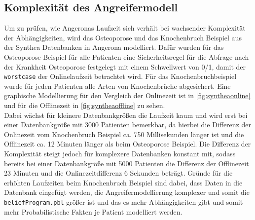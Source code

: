 \documentclass[german,version-2020-11]{uzl-thesis}
\begin{document}
\subsection{Komplexität des Angreifermodell}
Um zu prüfen, wie Angeronas Laufzeit sich verhält bei wachsender Komplexität der Abhängigkeiten, wird das Osteoporose und das Knochenbruch Beispiel aus der Synthea Datenbanken in Angerona modelliert. Dafür wurden für das Osteoporose Beispiel für alle Patienten eine Sicherheitsregel für die Abfrage nach der Krankheit Osteoporose festgelegt mit einem Schwellwert von 0/1, damit der \texttt{worstcase} der Onlinelaufzeit betrachtet wird. Für das Knochenbruchbeispiel wurde für jeden Patienten alle Arten von Knochenbrüche abgesichert. Eine graphische Modellierung für den Vergleich der Onlinezeit ist in \autoref{fig:syntheaonline} und für die Offlinezeit in \autoref{fig:syntheaoffline} zu sehen.\\  Dabei wächst für kleinere Datenbankgrößen die Laufzeit kaum und wird erst bei einer Datenbankgröße mit 3000 Patienten bemerkbar, da hierbei die Differenz der Onlinezeit vom Knochenbruch Beispiel ca. 750 Millisekunden länger ist und die Offlinezeit ca. 12 Minuten länger als beim Osteoporose Beispiel. Die Differenz der Komplexität steigt jedoch für komplexere Datenbanken konstant mit, sodass bereits bei einer Datenbankgröße mit 5000 Patienten die Differenz der Offlinezeit 23 Minuten und die Onlinezeitdifferenz 6 Sekunden beträgt.
Gründe für die erhöhten Laufzeiten beim Knochenbruch Beispiel sind dabei, dass Daten in die Datenbank eingefügt werden, die Angreifermodellierung komplexer und somit die \texttt{beliefProgram.pbl} größer ist und das es mehr Abhängigkeiten gibt und somit mehr Probabilistische Fakten je Patient modelliert werden.  
\end{document}
